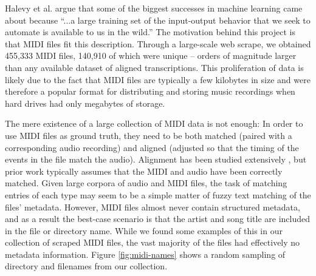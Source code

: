 \documentclass{article}
\begin{document}
Halevy et al. \cite{halevy2009unreasonable} argue that some of the biggest successes in machine learning came about because ``...a large training set of the input-output behavior that we seek to automate is available to us in the wild.''
The motivation behind this project is that MIDI files fit this description.
Through a large-scale web scrape, we obtained 455,333 MIDI files, 140,910 of which were unique -- orders of magnitude larger than any available dataset of aligned transcriptions.
This proliferation of data is likely due to the fact that MIDI files are typically a few kilobytes in size and were therefore a popular format for distributing and storing music recordings when hard drives had only megabytes of storage.


The mere existence of a large collection of MIDI data is not enough:  In order to use MIDI files as ground truth, they need to be both matched (paired with a corresponding audio recording) and aligned (adjusted so that the timing of the events in the file match the audio).
Alignment has been studied extensively  \cite{ewert2012towards, turetsky2003ground}, but prior work typically assumes that the MIDI and audio have been correctly matched.
Given large corpora of audio and MIDI files, the task of matching entries of each type may seem to be a simple matter of fuzzy text matching of the files' metadata.
However, MIDI files almost never contain structured metadata, and as a result the best-case scenario is that the artist and song title are included in the file or directory name.
While we found some examples of this in our collection of scraped MIDI files, the vast majority of the files had effectively no metadata information.
Figure \ref{fig:midi-names} shows a random sampling of directory and filenames from our collection.
\end{document}
